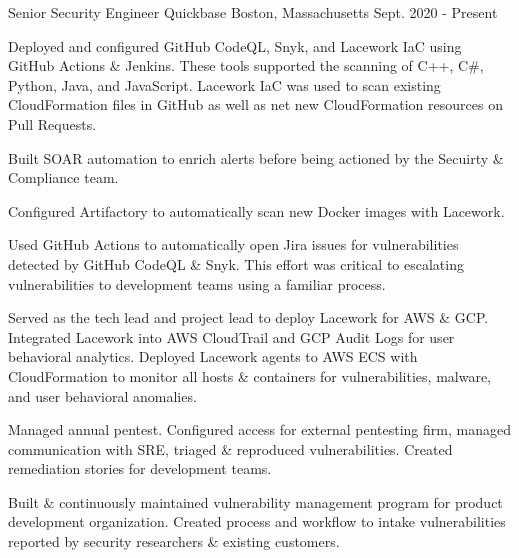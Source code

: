 

\begin{cventries}
\vspace{-3mm}
  \cventry
    {Senior Security Engineer} %
    {Quickbase} %
    {Boston, Massachusetts} %
    {Sept. 2020 - Present} %
    {
      \begin{cvitems} %
        \item {
          Deployed and configured GitHub CodeQL, Snyk, and Lacework IaC using GitHub Actions \& Jenkins. These tools supported the scanning of C++, C\#, Python, Java, and JavaScript. Lacework IaC was used to scan existing CloudFormation files in GitHub as well as net new CloudFormation resources on Pull Requests.
        }
        \item {
          Built SOAR automation to enrich alerts before being actioned by the Secuirty \& Compliance team.
        }
        \item {
          Configured Artifactory to automatically scan new Docker images with Lacework.
        }
        \item {
          Used GitHub Actions to automatically open Jira issues for vulnerabilities detected by GitHub CodeQL \& Snyk. This effort was critical to escalating vulnerabilities to development teams using a familiar process.
        }
        \item {
          Served as the tech lead and project lead to deploy Lacework for AWS \& GCP. Integrated Lacework into AWS CloudTrail and GCP Audit Logs for user behavioral analytics. Deployed Lacework agents to AWS ECS with CloudFormation to monitor all hosts \& containers for vulnerabilities, malware, and user behavioral anomalies.
        }
        \item {
          Managed annual pentest. Configured access for external pentesting firm, managed communication with SRE, triaged \& reproduced vulnerabilities. Created remediation stories for development teams.
        }
        \item {
          Built \& continuously maintained vulnerability management program for product development organization. Created process and workflow to intake vulnerabilities reported by security researchers \& existing customers.
}
\end{cvitems}}
\end{cventries}
